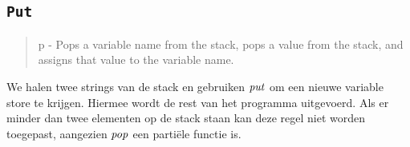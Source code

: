 \subsection{\texttt{Put}}
\label{sec:rules:put}

\begin{quote}
	p - Pops a variable name from the stack, pops a value from the stack, and
	assigns that value to the variable name.
\end{quote}

We halen twee strings van de stack en gebruiken $\mathit{put}$ om een nieuwe variable
store te krijgen. Hiermee wordt de rest van het programma uitgevoerd. Als er
minder dan twee elementen op de stack staan kan deze regel niet worden
toegepast, aangezien $\mathit{pop}$ een partiële functie is.
\therputns%
